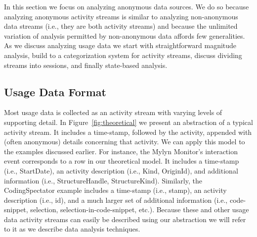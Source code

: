 In this section we focus on analyzing anonymous data sources. We do so because analyzing anonymous activity streams is similar to analyzing non-anonymous data streams (i.e., they are both activity streams) and because the unlimited variation of analysis permitted by non-anonymous data affords few generalities. As we discuss analyzing usage data we start with straightforward magnitude analysis, build to a categorization system for activity streams, discuss dividing streams into sessions, and finally state-based analysis. 

\subsection{Usage Data Format}

Most usage data is collected as an activity stream with varying levels of supporting detail. In Figure~\ref{fig:theoretical} we present an abstraction of a typical activity stream. It includes a time-stamp, followed by the activity, appended with (often anonymous) details concerning that activity. We can apply this model to the examples discussed earlier. For instance, the Mylyn Monitor's interaction event corresponds to a row in our theoretical model. It includes a time-stamp (i.e., StartDate), an activity description (i.e., Kind, OriginId), and additional information (i.e., StructureHandle, StructureKind). Similarly, the CodingSpectator example includes a time-stamp (i.e., stamp), an activity description (i.e., id), and a much larger set of additional information (i.e., code-snippet, selection, selection-in-code-snippet, etc.). Because these and other usage data activity streams can easily be described using our abstraction we will refer to it as we describe data analysis techniques.









